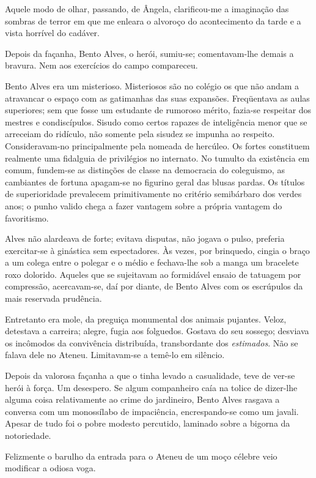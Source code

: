 Aquele modo de olhar,
passando, de Ângela, clarificou{}-me a imaginação das sombras de terror
em que me enleara o alvoroço do acontecimento da tarde e a vista
horrível do cadáver. 

Depois da façanha, Bento Alves, o herói,
sumiu{}-se; comentavam{}-lhe demais a bravura. Nem aos exercícios do
campo compareceu. 

Bento Alves era um misterioso. Misteriosos são no
colégio os que não andam a atravancar o espaço com as gatimanhas das
suas expansões. Freqüentava as aulas superiores; sem que fosse um
estudante de rumoroso mérito, fazia{}-se respeitar dos mestres e
condiscípulos. Sisudo como certos rapazes de inteligência menor que se
arreceiam do ridículo, não somente pela sisudez se impunha ao respeito.
Consideravam{}-no principalmente pela nomeada de hercúleo. Os fortes
constituem realmente uma fidalguia de privilégios no internato. No
tumulto da existência em comum, fundem{}-se as distinções de classe na
democracia do coleguismo, as cambiantes de fortuna apagam{}-se no
figurino geral das blusas pardas. Os títulos de superioridade
prevalecem primitivamente no critério semibárbaro dos verdes anos; o
punho valido chega a fazer vantagem sobre a própria vantagem do
favoritismo. 

Alves não alardeava de forte; evitava disputas, não jogava
o pulso, preferia exercitar{}-se à ginástica sem espectadores. Às
vezes, por brinquedo, cingia o braço a um colega entre o polegar e o
médio e fechava{}-lhe sob a manga um bracelete roxo dolorido. Aqueles
que se sujeitavam ao formidável ensaio de tatuagem por compressão,
acercavam{}-se, daí por diante, de Bento Alves com os escrúpulos da
mais reservada prudência. 

Entretanto era mole, da preguiça monumental
dos animais pujantes. Veloz, detestava a carreira; alegre, fugia aos
folguedos. Gostava do seu sossego; desviava os incômodos da convivência
distribuída, transbordante dos \textit{estimados}. Não se falava dele no Ateneu.
Limitavam{}-se a temê{}-lo em silêncio. 

Depois da valorosa façanha a
que o tinha levado a casualidade, teve de ver{}-se herói à força. Um
desespero. Se algum companheiro caía na tolice de dizer{}-lhe alguma
coisa relativamente ao crime do jardineiro, Bento Alves rasgava a
conversa com um monossílabo de impaciência, encrespando{}-se como um
javali. Apesar de tudo foi o pobre modesto percutido, laminado sobre a
bigorna da notoriedade. 

Felizmente o barulho da entrada para o Ateneu
de um moço célebre veio modificar a odiosa voga. 

